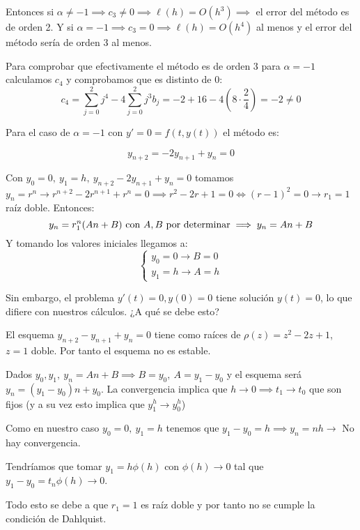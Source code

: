 \documentclass[openany]{book}
\begin{document}
\begin{exercise}
       Entonces si $ \alpha \ne -1 \implies c_3 \ne 0 \implies \ell(h) = O(h^3)  \implies $ el error del método es de orden 2. Y si $ \alpha = -1 \implies c_3 = 0 \implies \ell(h) = O(h^{4}) $ al menos y el error del método sería de orden 3 al menos.
       
       Para comprobar que efectivamente el método es de orden 3 para $ \alpha = -1 $ calculamos $ c_4 $ y comprobamos que es distinto de 0:
       $$ c_4 = \sum\limits_{j=0}^{2}j^{4}-4 \sum\limits_{j=0}^{2}j^3b_j = -2+16 -4(8\cdot \dfrac{2}{4}) = -2 \ne 0 $$
 
       Para el caso de $ \alpha = -1 $ con $ y' = 0 = f(t,y(t)) $ el método es:
       
       $$ y_{n+2} = -2y_{n+1} + y_n = 0 $$

       Con $ y_0=0,\ y_1 = h,\ y_{n+2}-2y_{n+1}+y_n = 0 $ tomamos $ y_n = r^{n} \to r^{n+2}-2r^{n+1}+r^{n} = 0 \implies r^2 -2r +1 = 0 \iff (r-1)^2 = 0 \to r_1 = 1$ raíz doble. Entonces:
       $$ y_n = r_1^{n}(An+B) \text{ con $ A,B $ por determinar} \implies y_n = An+B$$
       Y tomando los valores iniciales llegamos a:
       $$ \left\{
       \begin{array}{l}
           y_0= 0 \to B = 0\\
           y_1 = h \to A = h
       \end{array}
       \right. $$

       Sin embargo, el problema $ y'(t) = 0, y(0) = 0 $ tiene solución $ y(t) = 0 $, lo que difiere con nuestros cálculos. ¿A qué se debe esto?

       El esquema $ y_{n+2}-y_{n+1}+y_n = 0 $ tiene como raíces de $ \rho(z)=z^2-2z+1 $, $ z = 1 $ doble. Por tanto el esquema no es estable.

       Dados $ y_0,y_1,\ y_n = An+B \implies B = y_0,\ A =y_1-y_0$ y el esquema será $ y_n = (y_1-y_0)n +y_0$. La convergencia implica que $ h \to 0 \implies t_1 \to t_0$ que son fijos (y a su vez esto implica que $ y^{h}_1 \to y_0^{h}$)

       Como en nuestro caso $ y_0 = 0,\ y_1 = h $ tenemos que $ y_1-y_0 = h \implies y_n = nh \to  $ No hay convergencia.

       Tendríamos que tomar $ y_1 = h \phi(h) $ con $ \phi(h) \to 0 $ tal que $ y_1-y_0 = t_n \phi(h) \to 0 $.

       Todo esto se debe a que $ r_1 = 1 $ es raíz doble y por tanto no se cumple la condición de Dahlquist.
    \end{exercise}
\end{document}
